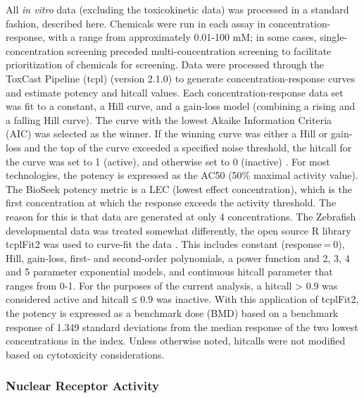 \documentclass[
  super,
  preprint,
  3p]{elsarticle}
\begin{document}
All \emph{in vitro} data (excluding the toxicokinetic data) was
processed in a standard fashion, described here. Chemicals were run in
each assay in concentration-response, with a range from approximately
0.01-100 mM; in some cases, single-concentration screening preceded
multi-concentration screening to facilitate prioritization of chemicals
for screening. Data were processed through the ToxCast Pipeline (tcpl)
\citep{filer_tcpl_2017} (version 2.1.0) to generate
concentration-response curves and estimate potency and hitcall values.
Each concentration-response data set was fit to a constant, a Hill
curve, and a gain-loss model (combining a rising and a falling Hill
curve). The curve with the lowest Akaike Information Criteria (AIC) was
selected as the winner. If the winning curve was either a Hill or
gain-loss and the top of the curve exceeded a specified noise threshold,
the hitcall for the curve was set to 1 (active), and otherwise set to 0
(inactive) \citep{filer_tcpl_2017}. For most technologies, the potency
is expressed as the AC50 (50\% maximal activity value). The BioSeek
potency metric is a LEC (lowest effect concentration), which is the
first concentration at which the response exceeds the activity
threshold. The reason for this is that data are generated at only 4
concentrations. The Zebrafish developmental data was treated somewhat
differently, the open source R library tcplFit2 was used to curve-fit
the data \citep{sheffield_tcplfit2_2022}. This includes constant
(response = 0), Hill, gain-loss, first- and second-order polynomials, a
power function and 2, 3, 4 and 5 parameter exponential models, and
continuous hitcall parameter that ranges from 0-1. For the purposes of
the current analysis, a hitcall \textgreater{} 0.9 was considered active
and hitcall ≤ 0.9 was inactive. With this application of tcplFit2, the
potency is expressed as a benchmark dose (BMD) based on a benchmark
response of 1.349 standard deviations from the median response of the
two lowest concentrations in the index. Unless otherwise noted, hitcalls
were not modified based on cytotoxicity considerations.

\hypertarget{nuclear-receptor-activity}{%
\subsubsection{Nuclear Receptor
Activity}\label{nuclear-receptor-activity}}
\end{document}
